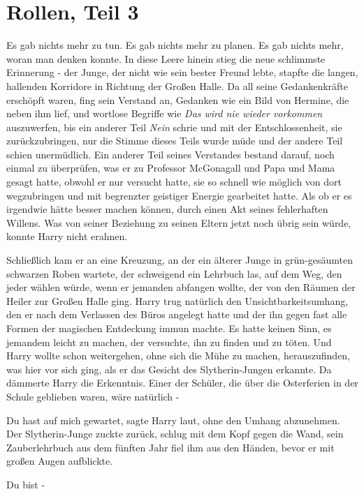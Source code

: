 \chapter{Rollen, Teil 3}

Es gab nichts mehr zu tun. Es gab nichts mehr zu planen. Es gab nichts mehr,
woran man denken konnte. In diese Leere hinein stieg die neue schlimmste
Erinnerung - der Junge, der nicht wie sein bester Freund lebte, stapfte die
langen, hallenden Korridore in Richtung der Großen Halle. Da all seine
Gedankenkräfte erschöpft waren, fing sein Verstand an, Gedanken wie ein Bild von
Hermine, die neben ihm lief, und wortlose Begriffe wie \emph{\glqq{}Das wird nie
wieder vorkommen\grqq{}} auszuwerfen, bis ein anderer Teil \emph{\glqq{}
Nein\grqq{}} schrie und mit der Entschlossenheit, sie zurückzubringen, nur die
Stimme dieses Teils wurde müde und der andere Teil schien unermüdlich. Ein
anderer Teil seines Verstandes bestand darauf, noch einmal zu überprüfen, was er
zu Professor McGonagall und Papa und Mama gesagt hatte, obwohl er nur versucht
hatte, sie so schnell wie möglich von dort wegzubringen und mit begrenzter
geistiger Energie gearbeitet hatte. Als ob er es irgendwie hätte besser machen
können, durch einen Akt seines fehlerhaften Willens. Was von seiner Beziehung zu
seinen Eltern jetzt noch übrig sein würde, konnte Harry nicht erahnen.

Schließlich kam er an eine Kreuzung, an der ein älterer Junge in grün-gesäumten
schwarzen Roben wartete, der schweigend ein Lehrbuch las, auf dem Weg, den jeder
wählen würde, wenn er jemanden abfangen wollte, der von den Räumen der Heiler
zur Großen Halle ging. Harry trug natürlich den Unsichtbarkeitsumhang, den er
nach dem Verlassen des Büros angelegt hatte und der ihn gegen fast alle Formen
der magischen Entdeckung immun machte. Es hatte keinen Sinn, es jemandem leicht
zu machen, der versuchte, ihn zu finden und zu töten. Und Harry wollte schon
weitergehen, ohne sich die Mühe zu machen, herauszufinden, was hier vor sich
ging, als er das Gesicht des Slytherin-Jungen erkannte. Da dämmerte Harry die
Erkenntnis. Einer der Schüler, die über die Osterferien in der Schule geblieben
waren, wäre natürlich -

\glqq{}Du hast auf mich gewartet\grqq{}, sagte Harry laut, ohne den Umhang
abzunehmen. Der Slytherin-Junge zuckte zurück, schlug mit dem Kopf gegen die
Wand, sein Zauberlehrbuch aus dem fünften Jahr fiel ihm aus den Händen, bevor er
mit großen Augen aufblickte.

\glqq{}Du bist -\grqq{}

